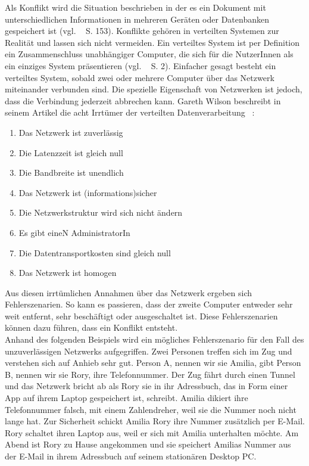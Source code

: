 Als Konflikt wird die Situation beschrieben in der es ein Dokument mit unterschiedlichen Informationen in mehreren Geräten oder Datenbanken gespeichert ist (vgl. ~\cite{couchDB} S. 153).
Konflikte gehören in verteilten Systemen zur Realität und lassen sich nicht vermeiden.
Ein verteiltes System ist per Definition ein Zusammenschluss unabhängiger Computer, die sich für die NutzerInnen als ein einziges System präsentieren (vgl. ~\cite{tanenbaum} S. 2).
Einfacher gesagt besteht ein verteiltes System, sobald zwei oder mehrere Computer über das Netzwerk miteinander verbunden sind.
Die spezielle Eigenschaft von Netzwerken ist jedoch, dass die Verbindung jederzeit abbrechen kann.
Gareth Wilson beschreibt in seinem Artikel die acht Irrtümer der verteilten Datenverarbeitung ~\cite{fallacies}:
\begin{enumerate}
  \item Das Netzwerk ist zuverlässig
  \item Die \gls{Latenz}zeit ist gleich null
  \item Die Bandbreite ist unendlich
  \item Das Netzwerk ist (informations)sicher
  \item Die Netzwerkstruktur wird sich nicht ändern
  \item Es gibt eineN AdministratorIn
  \item Die Datentransportkosten sind gleich null
  \item Das Netzwerk ist homogen
\end{enumerate}
Aus diesen irrtümlichen Annahmen über das Netzwerk ergeben sich Fehlerszenarien. So kann es passieren, dass der zweite Computer entweder sehr weit entfernt, sehr beschäftigt oder ausgeschaltet ist. Diese Fehlerszenarien können dazu führen, dass ein Konflikt entsteht.\\
Anhand des folgenden Beispiels wird ein mögliches Fehlerszenario für den Fall des unzuverlässigen Netzwerks aufgegriffen.
Zwei Personen treffen sich im Zug und verstehen sich auf Anhieb sehr gut. Person A, nennen wir sie Amilia, gibt Person B, nennen wir sie Rory, ihre Telefonnummer. Der Zug fährt durch einen Tunnel und das Netzwerk bricht ab als Rory sie in ihr Adressbuch, das in Form einer \gls{App} auf ihrem Laptop gespeichert ist, schreibt.
Amilia dikiert ihre Telefonnummer falsch, mit einem Zahlendreher, weil sie die Nummer noch nicht lange hat.
Zur Sicherheit schickt Amilia Rory ihre Nummer zusätzlich per E-Mail. Rory schaltet ihren Laptop aus, weil er sich mit Amilia unterhalten möchte.
Am Abend ist Rory zu Hause angekommen und sie speichert Amilias Nummer aus der E-Mail in ihrem Adressbuch auf seinem stationären Desktop PC.
